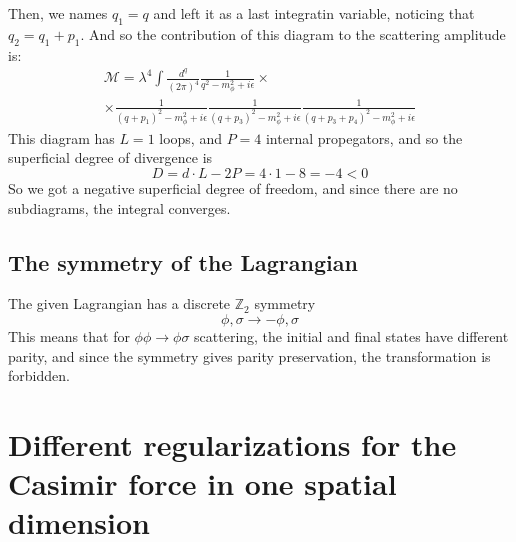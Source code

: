 \documentclass{article}
\begin{document}
Then, we names $q_1 = q$ and left it as a last integratin variable, noticing that $q_2 = q_1 + p_1$. And so the contribution of this diagram to the scattering amplitude is:
\begin{equation}
\begin{gathered}
    \mathcal{M} = \lambda^4 \int \frac{d^q}{(2\pi)^4}
    \frac{1}{q^2 - m_\phi^2 + i\epsilon}
    \times \\ \times
    \frac{1}{(q + p_1)^2 - m_\phi^2 + i\epsilon}
    \frac{1}{(q + p_3)^2 - m_\phi^2 + i\epsilon}
    \frac{1}{(q + p_3 + p_4)^2 - m_\phi^2 + i\epsilon}
\end{gathered}
\end{equation}
This diagram has $L = 1$ loops, and $P = 4$ internal propegators, and so the superficial degree of divergence is \begin{equation}
    D = d \cdot L - 2P = 4 \cdot 1 - 8 = -4 < 0
\end{equation}
So we got a negative superficial degree of freedom, and since there are no subdiagrams, the integral converges.
\subsection{The symmetry of the Lagrangian}
The given Lagrangian has a discrete $\mathbb{Z}_2$ symmetry
\begin{equation}
    \phi, \sigma \rightarrow -\phi, \sigma
\end{equation}
This means that for $\phi\phi \rightarrow \phi\sigma$ scattering, the initial and final states have different parity, and since the symmetry gives parity preservation, the transformation is forbidden.

\newpage
\section{Different regularizations for the Casimir force in one spatial dimension}
\end{document}
